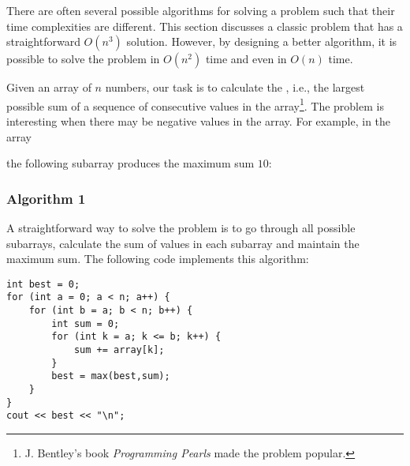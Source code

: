 
There are often several possible algorithms
for solving a problem such that their
time complexities are different.
This section discusses a classic problem that
has a straightforward $O(n^3)$ solution.
However, by designing a better algorithm, it
is possible to solve the problem in $O(n^2)$
time and even in $O(n)$ time.

Given an array of $n$ numbers,
our task is to calculate the
, i.e.,
the largest possible sum of 
a sequence of consecutive values
in the array\footnote{J. Bentley's
book \emph{Programming Pearls} \cite{ben86} made the problem popular.}.
The problem is interesting when there may be
negative values in the array.
For example, in the array
\begin{center}
\end{center}
\begin{samepage}
the following subarray produces the maximum sum $10$:
\begin{center}
\end{center}
\end{samepage}

\subsubsection{Algorithm 1}

A straightforward way to solve the problem
is to go through all possible subarrays,
calculate the sum of values in each subarray and maintain
the maximum sum.
The following code implements this algorithm:

\begin{lstlisting}
int best = 0;
for (int a = 0; a < n; a++) {
    for (int b = a; b < n; b++) {
        int sum = 0;
        for (int k = a; k <= b; k++) {
            sum += array[k];
        }
        best = max(best,sum);
    }
}
cout << best << "\n";
\end{lstlisting}

